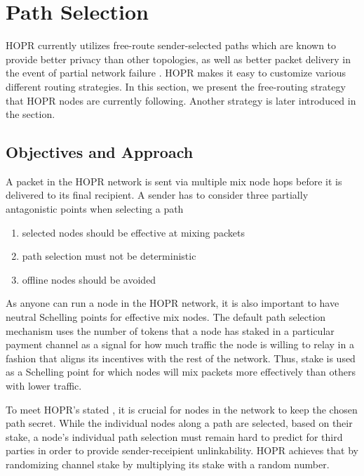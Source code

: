 \section{Path Selection}
\label{sec:path-selection}
HOPR currently utilizes free-route sender-selected paths which are known to provide better privacy than other topologies, as well as better packet delivery in the event of partial network failure \cite{Dingledine2004SynchronousBF}. HOPR makes it easy to customize various different routing strategies. In this section, we present the free-routing strategy that HOPR nodes are currently following. Another strategy is later introduced in the  section.

\subsection{Objectives and Approach}
A packet in the HOPR network is sent via multiple mix node hops before it is delivered to its final recipient. A sender has to consider three partially antagonistic points when selecting a path

\begin{enumerate}
    \item selected nodes should be effective at mixing packets
    \item path selection must not be deterministic
    \item offline nodes should be avoided
\end{enumerate}

As anyone can run a node in the HOPR network, it is also important to have neutral Schelling points for effective mix nodes. The default path selection mechanism uses the number of tokens that a node has staked in a particular payment channel as a signal for how much traffic the node is willing to relay in a fashion that aligns its incentives with the rest of the network. Thus, stake is used as a Schelling point for which nodes will mix packets more effectively than others with lower traffic.

To meet HOPR's stated , it is crucial for nodes in the network to keep the chosen path secret. While the individual nodes along a path are selected, based on their stake, a node's individual path selection must remain hard to predict for third parties in order to provide sender-receipient unlinkability. HOPR achieves that by randomizing channel stake by multiplying its stake with a random number.

